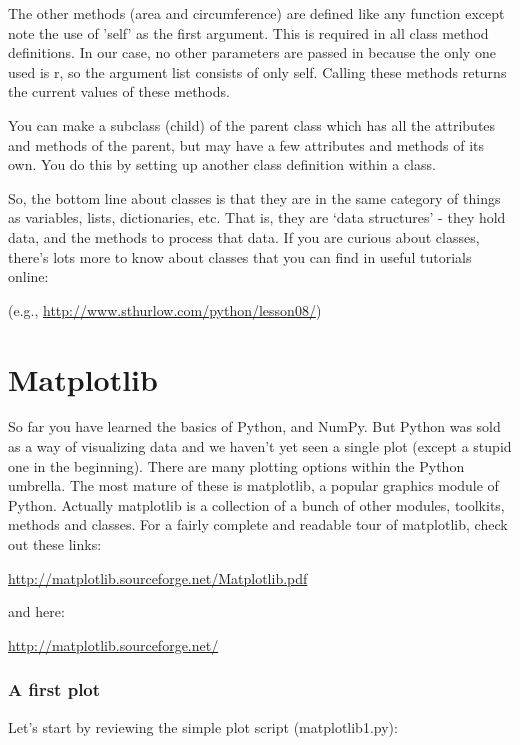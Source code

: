 \documentclass[11pt]{book}
\begin{document}
{{{{The other methods ({\color{blue}area} and {\color{blue}circumference}) are defined like any function except note the use of 'self' as the first argument.  This is required in all class method definitions.  In our case, no other parameters are passed in because the only one used is {\color{blue}r}, so the argument list consists of only {\color{blue}self}.  Calling these methods returns the current values of these methods.

You can make a subclass (child) of the parent class which has all the attributes and methods of the parent, but may have a few attributes and methods of its own.   You do this by setting up another class definition within a class.

So, the bottom line about classes is that they are  in the same category of things as variables, lists, dictionaries, etc. That is, they are  `data structures' - they hold data, and the methods to process that data.
If you are curious about classes, there's lots more to know about classes that you can find in useful tutorials online:

 (e.g., \url{http://www.sthurlow.com/python/lesson08/})



\section{Matplotlib}

So far you have learned the basics of Python, and NumPy.  But Python was sold as a way of visualizing data and we haven't yet seen a single plot (except a stupid one in the beginning). There are many plotting options within the Python umbrella. The most mature of these is {\color{blue}matplotlib}, a popular graphics module of Python.
Actually  {\color{blue}matplotlib} is a collection of a bunch of other modules, toolkits, methods and  classes.   For a fairly complete and readable tour of matplotlib, check out these links:

\url{http://matplotlib.sourceforge.net/Matplotlib.pdf}

\noindent
and here:

\url{http://matplotlib.sourceforge.net/}




\subsubsection{A first plot}

Let's start by reviewing the simple plot script ({\color{blue}matplotlib1.py}):


}}}}
\end{document}
